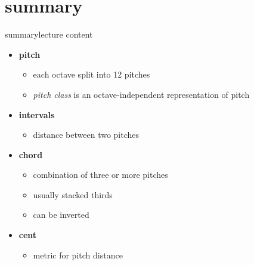     \section{summary}
        \begin{frame}{summary}{lecture content}
            \begin{itemize}
                \item   \textbf{pitch}
                    \begin{itemize}
                        \item   each octave split into 12 pitches
                        \item   \textit{pitch class} is an octave-independent representation of pitch
                    \end{itemize}
                \smallskip
                \item   \textbf{intervals}
                    \begin{itemize}
                        \item   distance between two pitches
                    \end{itemize}
                \smallskip
                \item   \textbf{chord}
                    \begin{itemize}
                        \item   combination of three or more pitches
                        \item   usually stacked thirds
                        \item   can be inverted
                    \end{itemize}
                \smallskip
                \item   \textbf{cent}
                    \begin{itemize}
                        \item   metric for pitch distance
                    \end{itemize}
            \end{itemize}
        \end{frame}


